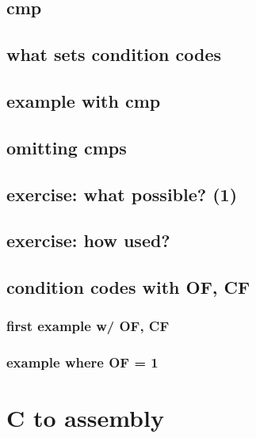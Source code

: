 \subsection{cmp}


\subsection{what sets condition codes}


\subsection{example with cmp}


\subsection{omitting cmps}


\subsection{exercise: what possible? (1)}


\subsection{exercise: how used?}


\subsection{condition codes with OF, CF}

\subsubsection{first example w/ OF, CF}


\subsubsection{example where OF = 1}


\section{C to assembly}

